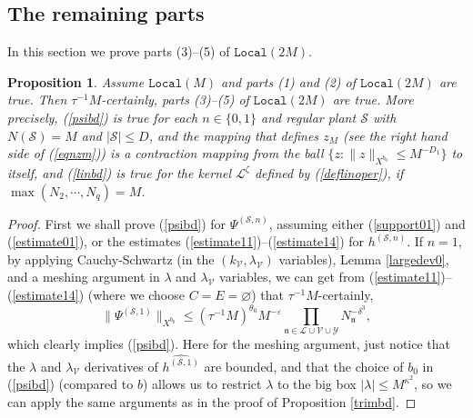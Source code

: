 \documentclass[11 pt,reqno]{amsart}
\newtheorem{prop}[thm]{Proposition}
\theoremstyle{definition}
\theoremstyle{remark}
\numberwithin{equation}{section}
\newcommand{\Sc}{\mathcal{S}}
\newcommand{\Lc}{\mathcal{L}}
\newcommand{\Vc}{\mathcal{V}}
\newcommand{\Yc}{\mathcal{Y}}
\newcommand{\nf}{\mathfrak{n}}
\newcommand{\Ls}{\mathscr{L}}
\begin{document}
{\subsection{The remaining parts} In this section we prove parts (3)--(5) of $\mathtt{Local}(2M)$.
\begin{prop}\label{induct3} Assume $\mathtt{Local}(M)$ and parts (1) and (2) of $\mathtt{Local}(2M)$ are true. Then $\tau^{-1}M$-certainly, parts (3)--(5) of $\mathtt{Local}(2M)$ are true. More precisely, (\ref{psibd}) is true for each $n\in\{0,1\}$ and regular plant $\Sc$ with $N(\Sc)=M$ and $|\Sc|\leq D$, and the mapping that defines $z_M$ (see the right hand side of (\ref{eqnzm})) is a contraction mapping from the ball $\{z:\|z\|_{X^{b_0}}\leq M^{-D_1}\}$ to itself, and (\ref{linbd}) is true for the kernel $\Ls^{\zeta}$ defined by (\ref{deflinoper}), if $\max(N_2,\cdots,N_q)=M$.
\end{prop}
\begin{proof} First we shall prove (\ref{psibd}) for $\Psi^{(\Sc,n)}$, assuming either (\ref{support01}) and (\ref{estimate01}), or the estimates (\ref{estimate11})--(\ref{estimate14}) for $h^{(\Sc,n)}$. If $n=1$, by applying Cauchy-Schwartz (in the $(k_\Vc,\lambda_\Vc)$ variables), Lemma \ref{largedev0}, and a meshing argument in $\lambda$ and $\lambda_\Vc$ variables, we can get from (\ref{estimate11})--(\ref{estimate14}) (where we choose $C=E=\varnothing$) that $\tau^{-1}M$-certainly,
\[\|\Psi^{(\Sc,1)}\|_{X^{b_0}}\leq (\tau^{-1}M)^{\theta_0}M^{-\varepsilon}\prod_{\nf\in\Lc\cup\Vc\cup\Yc}N_\nf^{-\delta^3},\] which clearly implies (\ref{psibd}). Here for the meshing argument, just notice that the $\lambda$ and $\lambda_\Vc$ derivatives of $\widehat{h^{(\Sc,1)}}$ are bounded, and that the choice of $b_0$ in (\ref{psibd}) (compared to $b$) allows us to restrict $\lambda$ to the big box $|\lambda|\leq M^{\kappa^2}$, so we can apply the same arguments as in the proof of Proposition \ref{trimbd}.


\end{proof}}
\end{document}
